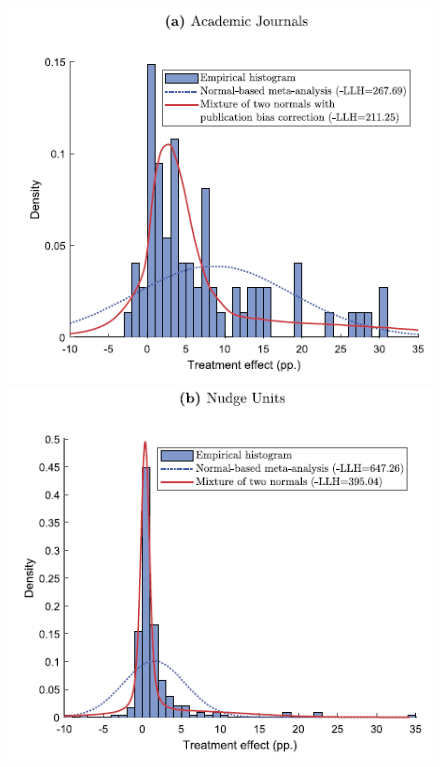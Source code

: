 \documentclass[dvipdfmx,11pt]{beamer}
\begin{document}
\begin{frame}{}
  \begin{figure}
    \centering
    \includegraphics[scale = .5]{fig_tab/os20220412/F7a.png}
    \includegraphics[scale = .5]{fig_tab/os20220412/F7b.png}
  \end{figure}
\end{frame}
\end{document}
